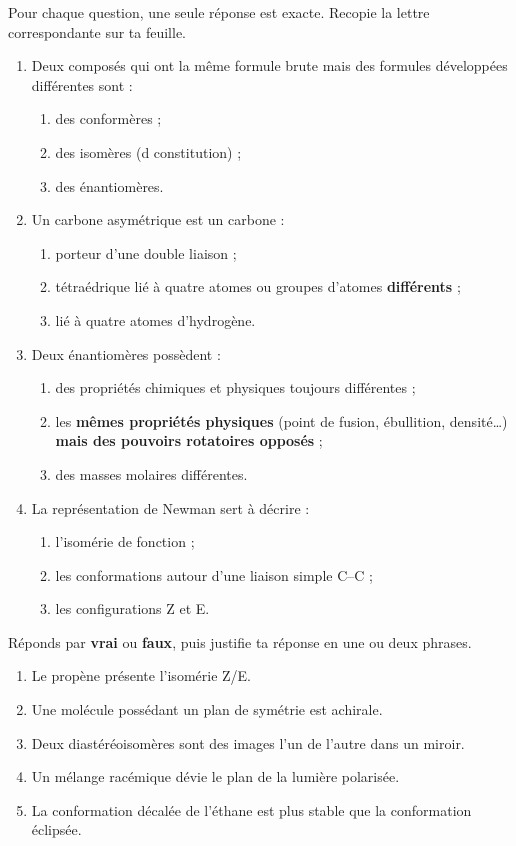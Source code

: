 \documentclass[11pt]{article}
\newcommand{\cle}[1]{{\popxbold\color{popdark}#1}}
\begin{document}
\begin{exercice}
Pour chaque question, une seule réponse est exacte. Recopie la lettre correspondante sur ta feuille.
\begin{enumerate}
\item Deux composés qui ont la même formule brute mais des formules développées différentes sont :
\begin{enumerate}
\item des conformères ;
\item des \cle{isomères} (d constitution) ;
\item des énantiomères.
\end{enumerate}
\item Un carbone asymétrique est un carbone :
\begin{enumerate}
\item porteur d'une double liaison ;
\item tétraédrique lié à quatre atomes ou groupes d'atomes \textbf{différents} ;
\item lié à quatre atomes d'hydrogène.
\end{enumerate}
\item Deux énantiomères possèdent :
\begin{enumerate}
\item des propriétés chimiques et physiques toujours différentes ;
\item les \textbf{mêmes propriétés physiques} (point de fusion, ébullition, densité\ldots) \textbf{mais des pouvoirs rotatoires opposés} ;
\item des masses molaires différentes.
\end{enumerate}
\item La représentation de Newman sert à décrire :
\begin{enumerate}
\item l'isomérie de fonction ;
\item les \cle{conformations} autour d'une liaison simple C--C ;
\item les configurations Z et E.
\end{enumerate}
\end{enumerate}
\end{exercice}

\begin{exercice}
Réponds par \textbf{vrai} ou \textbf{faux}, puis justifie ta réponse en une ou deux phrases.
\begin{enumerate}
\item Le propène  présente l'isomérie Z/E.
\item Une molécule possédant un plan de symétrie est \cle{achirale}.
\item Deux diastéréoisomères sont des images l'un de l'autre dans un miroir.
\item Un mélange racémique dévie le plan de la lumière polarisée.
\item La conformation décalée de l'éthane est plus stable que la conformation éclipsée.
\end{enumerate}
\end{exercice}
\end{document}
